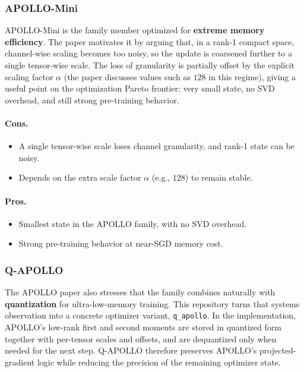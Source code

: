 \subsubsection{APOLLO-Mini}
APOLLO-Mini is the family member optimized for \textbf{extreme memory efficiency}. The paper motivates it by arguing that, in a rank-1 compact space, channel-wise scaling becomes too noisy, so the update is coarsened further to a single tensor-wise scale. The loss of granularity is partially offset by the explicit scaling factor $\alpha$ (the paper discusses values such as $128$ in this regime), giving a useful point on the optimization Pareto frontier: very small state, no SVD overhead, and still strong pre-training behavior.

\paragraph{Cons.}
\begin{itemize}[leftmargin=*]
\item A single tensor-wise scale loses channel granularity, and rank-1 state can be noisy.
\item Depends on the extra scale factor $\alpha$ (e.g., $128$) to remain stable.
\end{itemize}

\paragraph{Pros.}
\begin{itemize}[leftmargin=*]
\item Smallest state in the APOLLO family, with no SVD overhead.
\item Strong pre-training behavior at near-SGD memory cost.
\end{itemize}

\subsubsection{Q-APOLLO}
The APOLLO paper also stresses that the family combines naturally with \textbf{quantization} for ultra-low-memory training. This repository turns that systems observation into a concrete optimizer variant, \texttt{q\_apollo}. In the implementation, APOLLO's low-rank first and second moments are stored in quantized form together with per-tensor scales and offsets, and are dequantized only when needed for the next step. Q-APOLLO therefore preserves APOLLO's projected-gradient logic while reducing the precision of the remaining optimizer state.

